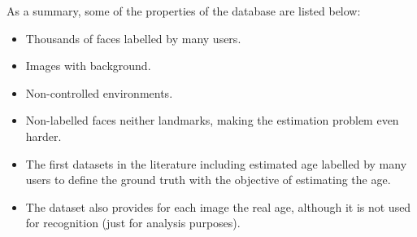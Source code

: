As a summary, some of the properties of the database are listed below:

\begin{itemize}
	\item Thousands of faces labelled by many users.
	\item Images with background.
	\item Non-controlled environments.
	\item Non-labelled faces neither landmarks, making the estimation problem even harder.
	\item The first datasets in the literature including
	estimated age labelled by many users to define the ground truth with the objective of estimating the age.
	\item The dataset also provides for each image the real age, although it is not used for recognition (just for analysis purposes).
\end{itemize}
